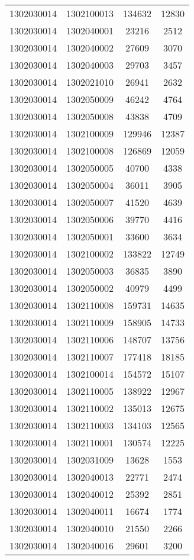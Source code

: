 \begin{longtable}{llcc}
1302030014 & 1302100013 & 134632 & 12830\\
1302030014 & 1302040001 & 23216 & 2512\\
1302030014 & 1302040002 & 27609 & 3070\\
1302030014 & 1302040003 & 29703 & 3457\\
1302030014 & 1302021010 & 26941 & 2632\\
1302030014 & 1302050009 & 46242 & 4764\\
1302030014 & 1302050008 & 43838 & 4709\\
1302030014 & 1302100009 & 129946 & 12387\\
1302030014 & 1302100008 & 126869 & 12059\\
1302030014 & 1302050005 & 40700 & 4338\\
1302030014 & 1302050004 & 36011 & 3905\\
1302030014 & 1302050007 & 41520 & 4639\\
1302030014 & 1302050006 & 39770 & 4416\\
1302030014 & 1302050001 & 33600 & 3634\\
1302030014 & 1302100002 & 133822 & 12749\\
1302030014 & 1302050003 & 36835 & 3890\\
1302030014 & 1302050002 & 40979 & 4499\\
1302030014 & 1302110008 & 159731 & 14635\\
1302030014 & 1302110009 & 158905 & 14733\\
1302030014 & 1302110006 & 148707 & 13756\\
1302030014 & 1302110007 & 177418 & 18185\\
1302030014 & 1302100014 & 154572 & 15107\\
1302030014 & 1302110005 & 138922 & 12967\\
1302030014 & 1302110002 & 135013 & 12675\\
1302030014 & 1302110003 & 134103 & 12565\\
1302030014 & 1302110001 & 130574 & 12225\\
1302030014 & 1302031009 & 13628 & 1553\\
1302030014 & 1302040013 & 22771 & 2474\\
1302030014 & 1302040012 & 25392 & 2851\\
1302030014 & 1302040011 & 16674 & 1774\\
1302030014 & 1302040010 & 21550 & 2266\\
1302030014 & 1302040016 & 29601 & 3200\\

\end{longtable}
